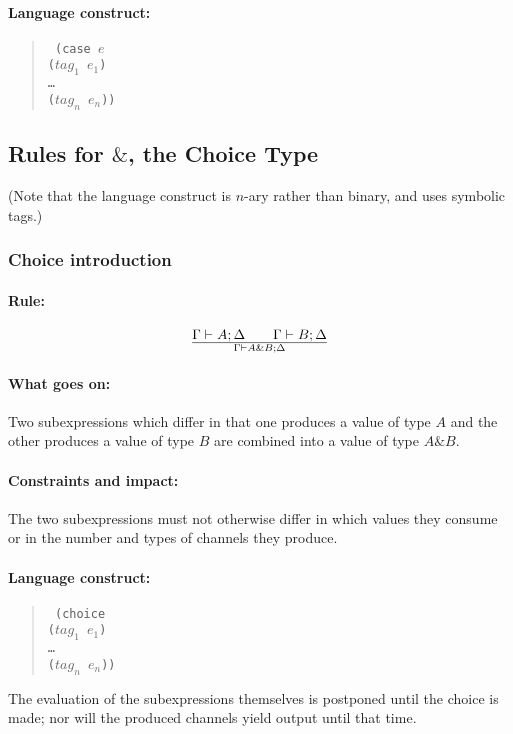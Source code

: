 \documentclass[a4paper]{article}
\begin{document}
\paragraph{Language construct:}
\begin{quote}\tt
  (case $e$\\
  \phantom{ }\quad ($\mathit{tag_1}$ $\mathit{e_1}$)\\
  \phantom{ }\quad \ldots\\
  \phantom{ }\quad ($\mathit{tag_n}$ $\mathit{e_n}$))
\end{quote}



\subsection{Rules for $\&$, the Choice Type}

(Note that the language construct is $n$-ary rather than binary, and
uses symbolic tags.)

\subsubsection{Choice introduction}

\paragraph{Rule:}
$$
{
  \Gamma \vdash A; \Delta
  \qquad
  \Gamma \vdash B; \Delta
}\over{
  \Gamma \vdash A\&B; \Delta
}
$$
\paragraph{What goes on:} Two subexpressions which differ in that one
produces a value of type $A$ and the other produces a value of type
$B$ are combined into a value of type $A\&B$.

\paragraph{Constraints and impact:} The two subexpressions must not
otherwise differ in which values they consume or in the number and
types of channels they produce.

\paragraph{Language construct:}
\begin{quote}\tt
  (choice\\
  \phantom{ }\quad ($\mathit{tag}_1$ $e_1$)\\
  \phantom{ }\quad \ldots\\
  \phantom{ }\quad ($\mathit{tag}_n$ $e_n$))
\end{quote}
The evaluation of the subexpressions themselves is postponed until the
choice is made; nor will the produced channels yield output until that time.
\end{document}
